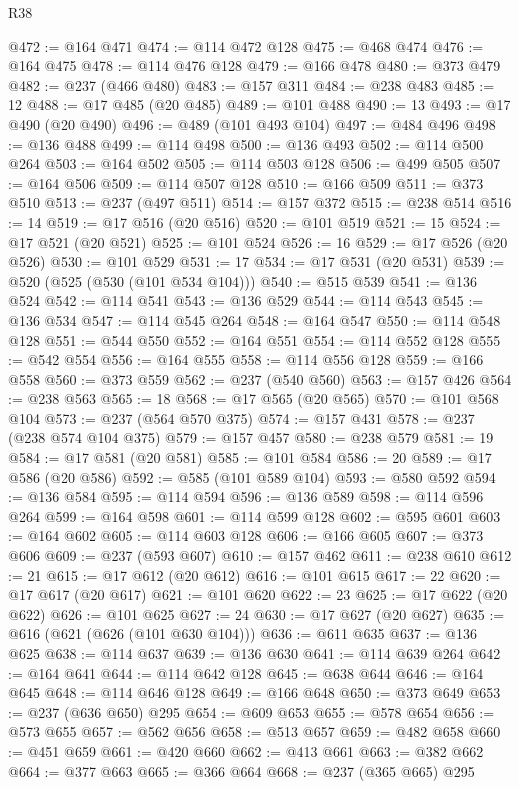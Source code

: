 \begin{lexlean}{R38}
\begin{coremodule}
@472 := @164 @471
@474 := @114 @472 @128
@475 := @468 @474
@476 := @164 @475
@478 := @114 @476 @128
@479 := @166 @478
@480 := @373 @479
@482 := @237 (@466 @480)
@483 := @157 @311
@484 := @238 @483
@485 := 12
@488 := @17 @485 (@20 @485)
@489 := @101 @488
@490 := 13
@493 := @17 @490 (@20 @490)
@496 := @489 (@101 @493 @104)
@497 := @484 @496
@498 := @136 @488
@499 := @114 @498
@500 := @136 @493
@502 := @114 @500 @264
@503 := @164 @502
@505 := @114 @503 @128
@506 := @499 @505
@507 := @164 @506
@509 := @114 @507 @128
@510 := @166 @509
@511 := @373 @510
@513 := @237 (@497 @511)
@514 := @157 @372
@515 := @238 @514
@516 := 14
@519 := @17 @516 (@20 @516)
@520 := @101 @519
@521 := 15
@524 := @17 @521 (@20 @521)
@525 := @101 @524
@526 := 16
@529 := @17 @526 (@20 @526)
@530 := @101 @529
@531 := 17
@534 := @17 @531 (@20 @531)
@539 := @520 (@525 (@530 (@101 @534 @104)))
@540 := @515 @539
@541 := @136 @524
@542 := @114 @541
@543 := @136 @529
@544 := @114 @543
@545 := @136 @534
@547 := @114 @545 @264
@548 := @164 @547
@550 := @114 @548 @128
@551 := @544 @550
@552 := @164 @551
@554 := @114 @552 @128
@555 := @542 @554
@556 := @164 @555
@558 := @114 @556 @128
@559 := @166 @558
@560 := @373 @559
@562 := @237 (@540 @560)
@563 := @157 @426
@564 := @238 @563
@565 := 18
@568 := @17 @565 (@20 @565)
@570 := @101 @568 @104
@573 := @237 (@564 @570 @375)
@574 := @157 @431
@578 := @237 (@238 @574 @104 @375)
@579 := @157 @457
@580 := @238 @579
@581 := 19
@584 := @17 @581 (@20 @581)
@585 := @101 @584
@586 := 20
@589 := @17 @586 (@20 @586)
@592 := @585 (@101 @589 @104)
@593 := @580 @592
@594 := @136 @584
@595 := @114 @594
@596 := @136 @589
@598 := @114 @596 @264
@599 := @164 @598
@601 := @114 @599 @128
@602 := @595 @601
@603 := @164 @602
@605 := @114 @603 @128
@606 := @166 @605
@607 := @373 @606
@609 := @237 (@593 @607)
@610 := @157 @462
@611 := @238 @610
@612 := 21
@615 := @17 @612 (@20 @612)
@616 := @101 @615
@617 := 22
@620 := @17 @617 (@20 @617)
@621 := @101 @620
@622 := 23
@625 := @17 @622 (@20 @622)
@626 := @101 @625
@627 := 24
@630 := @17 @627 (@20 @627)
@635 := @616 (@621 (@626 (@101 @630 @104)))
@636 := @611 @635
@637 := @136 @625
@638 := @114 @637
@639 := @136 @630
@641 := @114 @639 @264
@642 := @164 @641
@644 := @114 @642 @128
@645 := @638 @644
@646 := @164 @645
@648 := @114 @646 @128
@649 := @166 @648
@650 := @373 @649
@653 := @237 (@636 @650) @295
@654 := @609 @653
@655 := @578 @654
@656 := @573 @655
@657 := @562 @656
@658 := @513 @657
@659 := @482 @658
@660 := @451 @659
@661 := @420 @660
@662 := @413 @661
@663 := @382 @662
@664 := @377 @663
@665 := @366 @664
@668 := @237 (@365 @665) @295

\end{coremodule}
\end{lexlean}

